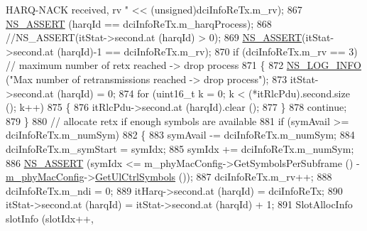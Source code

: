 \begin{DoxyCode}
{       HARQ-NACK received, rv " << (unsigned)dciInfoReTx.m\_rv);}
867                                 \hyperlink{assert_8h_a6dccdb0de9b252f60088ce281c49d052}{NS\_ASSERT} (harqId == dciInfoReTx.m\_harqProcess);
868                                 \textcolor{comment}{//NS\_ASSERT(itStat->second.at (harqId) > 0);}
869                                 \hyperlink{assert_8h_a6dccdb0de9b252f60088ce281c49d052}{NS\_ASSERT}(itStat->second.at (harqId)-1 == dciInfoReTx.m\_rv);
870                                 \textcolor{keywordflow}{if} (dciInfoReTx.m\_rv == 3) \textcolor{comment}{// maximum number of retx reached -> drop
       process}
871                                 \{
872                                         \hyperlink{group__logging_gafbd73ee2cf9f26b319f49086d8e860fb}{NS\_LOG\_INFO} (\textcolor{stringliteral}{"Max number of retransmissions reached ->
       drop process"});
873                                         itStat->second.at (harqId) = 0;
874                                         \textcolor{keywordflow}{for} (uint16\_t k = 0; k < (*itRlcPdu).second.size (); k++)
875                                         \{
876                                                 itRlcPdu->second.at (harqId).clear ();
877                                         \}
878                                         \textcolor{keywordflow}{continue};
879                                 \}
880                                 \textcolor{comment}{// allocate retx if enough symbols are available}
881                                 \textcolor{keywordflow}{if} (symAvail >= dciInfoReTx.m\_numSym)
882                                 \{
883                                         symAvail -= dciInfoReTx.m\_numSym;
884                                         dciInfoReTx.m\_symStart = symIdx;
885                                         symIdx += dciInfoReTx.m\_numSym;
886                                         \hyperlink{assert_8h_a6dccdb0de9b252f60088ce281c49d052}{NS\_ASSERT} (symIdx <= m\_phyMacConfig->GetSymbolsPerSubframe
       () - \hyperlink{classns3_1_1MmWaveMacScheduler_a24d7af4971d2e500fe543cefbafa2fd9}{m\_phyMacConfig}->\hyperlink{classns3_1_1MmWavePhyMacCommon_aa0bf8af14050bc5dc6513fbc86319a9b}{GetUlCtrlSymbols} ());
887                                         dciInfoReTx.m\_rv++;
888                                         dciInfoReTx.m\_ndi = 0;
889                                         itHarq->second.at (harqId) = dciInfoReTx;
890                                         itStat->second.at (harqId) = itStat->second.at (harqId) + 1;
891                                         SlotAllocInfo slotInfo (slotIdx++, 

\end{DoxyCode}

